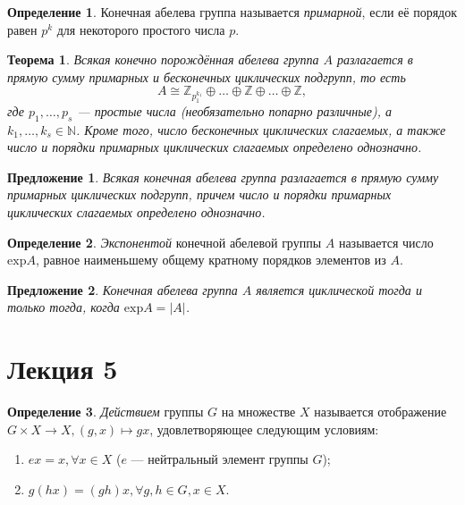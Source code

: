 \documentclass[a4paper]{article}
\theoremstyle{plain}
\newtheorem*{theorem}{Теорема}
\newtheorem{proposal}{Предложение}
\theoremstyle{definition}
\newtheorem{definition}{Определение}
\numberwithin{definition}{section}
\numberwithin{proposal}{section}
\begin{document}
\begin{definition}
Конечная абелева группа называется \emph{примарной}, если её порядок равен \(p^k\) для некоторого простого числа \(p\).
\end{definition}

\begin{theorem}
Всякая конечно порождённая абелева группа \(A\) разлагается в прямую сумму примарных и бесконечных циклических подгрупп, то есть
\begin{equation*}
	A \cong \mathbb{Z}_{p_1^{k_1}} \oplus \dots \oplus \mathbb{Z} \oplus \dots \oplus \mathbb{Z},
\end{equation*}
где \(p_1, \dots, p_s\) --- простые числа (необязательно попарно различные), а \(k_1, \dots, k_s \in \mathbb{N}\). Кроме того, число бесконечных циклических слагаемых, а также число и порядки примарных циклических слагаемых определено однозначно. 
\end{theorem}

\begin{proposal}
Всякая конечная абелева группа разлагается в прямую сумму примарных циклических подгрупп, причем число и порядки примарных циклических слагаемых определено однозначно.
\end{proposal}

\begin{definition}
\emph{Экспонентой} конечной абелевой группы \(A\) называется число \(\mathrm{exp} A\), равное наименьшему общему кратному порядков элементов из \(A\).
\end{definition}

\begin{proposal}
Конечная абелева группа \(A\) является циклической тогда и только тогда, когда \(\mathrm{exp} A = |A|\).
\end{proposal}


\section{Лекция 5}

\begin{definition}
\emph{Действием} группы \(G\) на множестве \(X\) называется отображение \(G \times X \rightarrow X, (g, x) \mapsto gx\), удовлетворяющее следующим условиям:
\begin{enumerate}
	\item \(ex = x, \forall x \in X\) (\(e\) --- нейтральный элемент группы \(G\));
	\item \(g(hx) = (gh)x, \forall g,h \in G, x \in X\). 
\end{enumerate}
\end{definition}
\end{document}
